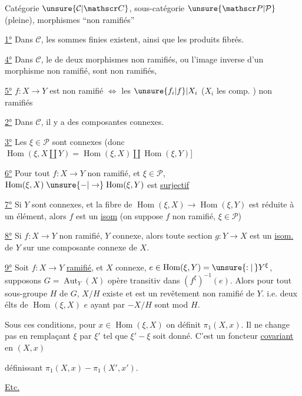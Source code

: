 Catégorie $\unsure{\mathcal C|\mathscr C}$, sous-catégorie $\unsure{\mathscr P|\mathcal P}$\deleted{\unsure{,}} (pleine), morphismes ``non ramifiés''

\uline{1°} Dans $\mathcal C$, les sommes finies existent, ainsi que les produits fibrés.

\uline{4°} Dans $\mathcal C$, le   de deux morphismes non ramifiés,  ou l'image
inverse d'un morphisme non ramifié, sont non ramifiés, 

\uline{5°}  $f:X\to Y$ est non ramifié $\Longleftrightarrow$ les $\unsure{f_i|f}\vert X_i$ ($X_i$ les comp. )  non ramifiés

\uline{2°} Dans $\mathcal C$, il y a des composantes connexes.

\uline{3°} Les  $\xi\in\mathscr P$ sont connexes (donc $\operatorname{Hom}(\xi,X\amalg Y)=\operatorname{Hom}(\xi,X)\amalg\operatorname{Hom}(\xi,Y)$]

\uline{6°} Pour tout $f:X\to Y$ non ramifié,  et $\xi\in\mathscr P$, $\operatorname{Hom}(\xi,X)\mathrel{\unsure{-|\to}}\operatorname{Hom}(\xi,Y)$ est
\uline{surjectif}

\uline{7°} Si  $Y$ sont connexes, et la fibre de $\operatorname{Hom}(\xi,X)\to\operatorname{Hom}(\xi,Y)$ est
réduite à un élément, alors  $f$ est un \uline{isom}
(on suppose $f$ non ramifié, $\xi\in\mathscr P$)

\uline{8°} Si $f:X\to Y$ non ramifié, $Y$ connexe, alors  toute
 section $g:Y\to X$ est un \uline{isom.} de $Y$ sur une
composante connexe de $X$.

\uline{9°} Soit  $f:X\to Y$ \uline{ramifié}, et
$X$ connexe, \deleted{\unsure{$\xi\in$}} $e\in\operatorname{Hom}(\xi,Y)=\unsure{:|\,}Y^\xi$, supposons $G=\operatorname{Aut}_Y(X)$
opère transitiv dans $(f^\xi)^{-1}(e)$. Alors pour tout
sous-groupe $H$ de $G$, $X/H$ existe  et est un
revêtement non ramifié de $Y$. 
i.e. deux élts de $\operatorname{Hom}(\xi,X)$  $e$
ayant  par  $\mathrel{-} X/H$ sont  mod $H$.

Sous ces conditions, pour $x\in\operatorname{Hom}(\xi,X)$ on définit
$\pi_1(X,x)$. Il ne change pas  en remplaçant $\xi$ par $\xi'$ tel que
$\xi'\mathrel{-}\xi$ soit donné. C'est un foncteur \uline{covariant} en $(X,x)$

définissant $\pi_1(X,x)\mathrel{-}\pi_1(X',x')$.

\uline{Etc.}
